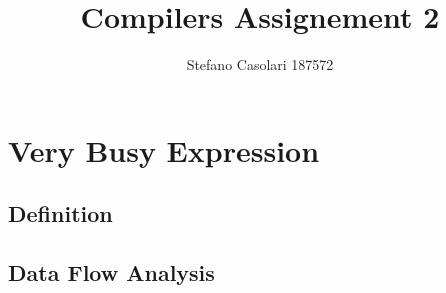 \documentclass{article}
\begin{document}
	\begin{titlepage}
		\title{Compilers Assignement 2}
		\author{Stefano Casolari 187572}
		\maketitle
	\end{titlepage}
	\tableofcontents
	\newpage
	\section{Very Busy Expression}
	\subsection{Definition}
	\subsection{Data Flow Analysis}
\end{document}
